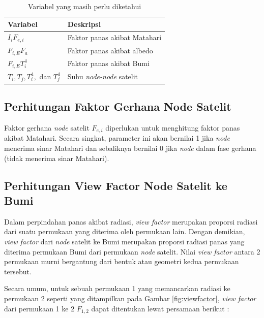 \begin{table}[!ht]
\begin{center}
\caption{Variabel yang masih perlu diketahui}
\label{table:unknown}
\begin{tabular}{|l|l|}
\hline
Variabel & Deskripsi \\ \hline
	$I_i F_{e,i}$        & Faktor panas akibat Matahari         \\ \hline
	$F_{i,E} F_a$        & Faktor panas akibat albedo         \\ \hline
	$F_{i,E} T_i^4$        & Faktor panas akibat Bumi         \\ \hline
	$T_i, T_j, T_i^4,$ dan $T_j^4$        & Suhu \textit{node-node} satelit         \\ \hline
\end{tabular}
\end{center}
\vspace{-5mm}
\end{table}

\subsection{Perhitungan Faktor Gerhana Node Satelit}

Faktor gerhana \textit{node} satelit $F_{e,i}$ diperlukan untuk menghitung faktor panas
akibat Matahari. Secara singkat, parameter ini akan bernilai 1 jika \textit{node}
menerima sinar Matahari dan sebaliknya bernilai 0 jika \textit{node} dalam fase gerhana
(tidak menerima sinar Matahari).

\subsection{Perhitungan View Factor Node Satelit ke Bumi}

Dalam perpindahan panas akibat radiasi, \textit{view factor} merupakan proporsi
radiasi dari suatu permukaan yang diterima oleh permukaan lain. Dengan
demikian, \textit{view factor} dari \textit{node} satelit ke Bumi merupakan
proporsi radiasi panas yang diterima permukaan Bumi dari permukaan
\textit{node} satelit. Nilai \textit{view factor} antara 2 permukaan murni
bergantung dari bentuk atau geometri kedua permukaan tersebut.

Secara umum, untuk sebuah permukaan 1 yang memancarkan radiasi ke permukaan 2 seperti yang
ditampilkan pada Gambar \ref{fig:viewfactor}, \textit{view factor} dari
permukaan 1 ke 2 $F_{1,2}$ dapat ditentukan lewat persamaan berikut
\cite{muneer2020}:

